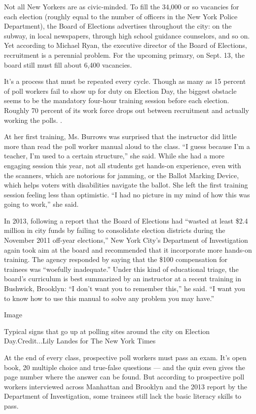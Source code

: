 Not all New Yorkers are as civic-minded. To fill the 34,000 or so
vacancies for each election (roughly equal to the number of officers in
the New York Police Department), the Board of Elections advertises
throughout the city: on the subway, in local newspapers, through high
school guidance counselors, and so on. Yet according to Michael Ryan,
the executive director of the Board of Elections, recruitment is a
perennial problem. For the upcoming primary, on Sept. 13, the board
still must fill about 6,400 vacancies.

It's a process that must be repeated every cycle. Though as many as 15
percent of poll workers fail to show up for duty on Election Day, the
biggest obstacle seems to be the mandatory four-hour training session
before each election. Roughly 70 percent of its work force drops out
between recruitment and actually working the polls. .

At her first training, Ms. Burrows was surprised that the instructor did
little more than read the poll worker manual aloud to the class. ``I
guess because I'm a teacher, I'm used to a certain structure,'' she
said. While she had a more engaging session this year, not all students
get hands-on experience, even with the scanners, which are notorious for
jamming, or the Ballot Marking Device, which helps voters with
disabilities navigate the ballot. She left the first training session
feeling less than optimistic. ``I had no picture in my mind of how this
was going to work,'' she said.

In 2013, following a report that the Board of Elections had ``wasted at
least \$2.4 million in city funds by failing to consolidate election
districts during the November 2011 off-year elections,'' New York City's
Department of Investigation again took aim at the board and recommended
that it incorporate more hands-on training. The agency responded by
saying that the \$100 compensation for trainees was ``woefully
inadequate.'' Under this kind of educational triage, the board's
curriculum is best summarized by an instructor at a recent training in
Bushwick, Brooklyn: ``I don't want you to remember this,'' he said. ``I
want you to know how to use this manual to solve any problem you may
have.''

Image

Typical signs that go up at polling sites around the city on Election
Day.Credit...Lily Landes for The New York Times

At the end of every class, prospective poll workers must pass an exam.
It's open book, 20 multiple choice and true-false questions --- and the
quiz even gives the page number where the answer can be found. But
according to prospective poll workers interviewed across Manhattan and
Brooklyn and the 2013 report by the Department of Investigation, some
trainees still lack the basic literacy skills to pass.

